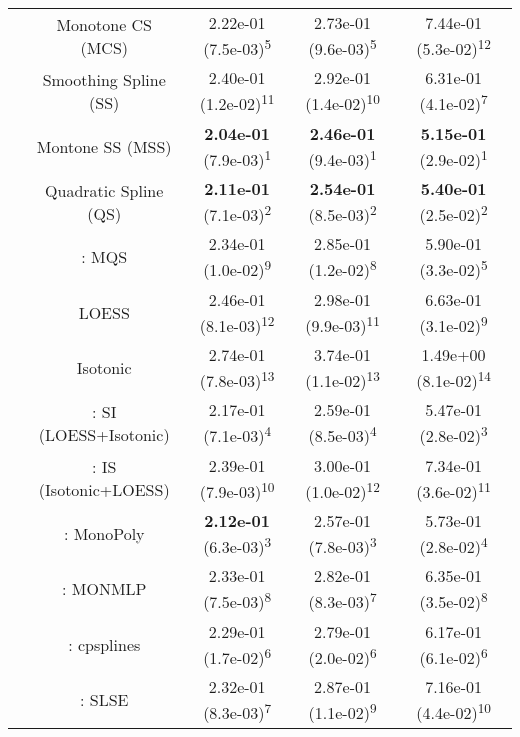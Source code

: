\begin{tabular}{ccccc}
&Monotone CS (MCS)& 2.22e-01 (7.5e-03)\textsuperscript{5}& 2.73e-01 (9.6e-03)\textsuperscript{5}& 7.44e-01 (5.3e-02)\textsuperscript{12}\tabularnewline
&Smoothing Spline (SS)& 2.40e-01 (1.2e-02)\textsuperscript{11}& 2.92e-01 (1.4e-02)\textsuperscript{10}& 6.31e-01 (4.1e-02)\textsuperscript{7}\tabularnewline
&Montone SS (MSS)& \textbf{2.04e-01} (7.9e-03)\textsuperscript{1}& \textbf{2.46e-01} (9.4e-03)\textsuperscript{1}& \textbf{5.15e-01} (2.9e-02)\textsuperscript{1}\tabularnewline
&Quadratic Spline (QS)& \textbf{2.11e-01} (7.1e-03)\textsuperscript{2}& \textbf{2.54e-01} (8.5e-03)\textsuperscript{2}& \textbf{5.40e-01} (2.5e-02)\textsuperscript{2}\tabularnewline
&\textcite{heMonotoneBsplineSmoothing1998}: MQS& 2.34e-01 (1.0e-02)\textsuperscript{9}& 2.85e-01 (1.2e-02)\textsuperscript{8}& 5.90e-01 (3.3e-02)\textsuperscript{5}\tabularnewline
&LOESS& 2.46e-01 (8.1e-03)\textsuperscript{12}& 2.98e-01 (9.9e-03)\textsuperscript{11}& 6.63e-01 (3.1e-02)\textsuperscript{9}\tabularnewline
&Isotonic& 2.74e-01 (7.8e-03)\textsuperscript{13}& 3.74e-01 (1.1e-02)\textsuperscript{13}& 1.49e+00 (8.1e-02)\textsuperscript{14}\tabularnewline
&\textcite{mammenEstimatingSmoothMonotone1991}: SI (LOESS+Isotonic)& 2.17e-01 (7.1e-03)\textsuperscript{4}& 2.59e-01 (8.5e-03)\textsuperscript{4}& 5.47e-01 (2.8e-02)\textsuperscript{3}\tabularnewline
&\textcite{mammenEstimatingSmoothMonotone1991}: IS (Isotonic+LOESS)& 2.39e-01 (7.9e-03)\textsuperscript{10}& 3.00e-01 (1.0e-02)\textsuperscript{12}& 7.34e-01 (3.6e-02)\textsuperscript{11}\tabularnewline
&\textcite{murrayFastFlexibleMethods2016a}: MonoPoly& \textbf{2.12e-01} (6.3e-03)\textsuperscript{3}& 2.57e-01 (7.8e-03)\textsuperscript{3}& 5.73e-01 (2.8e-02)\textsuperscript{4}\tabularnewline
&\textcite{cannonMonmlpMultilayerPerceptron2017}: MONMLP& 2.33e-01 (7.5e-03)\textsuperscript{8}& 2.82e-01 (8.3e-03)\textsuperscript{7}& 6.35e-01 (3.5e-02)\textsuperscript{8}\tabularnewline
&\textcite{navarro-garciaConstrainedSmoothingOutofrange2023}: cpsplines& 2.29e-01 (1.7e-02)\textsuperscript{6}& 2.79e-01 (2.0e-02)\textsuperscript{6}& 6.17e-01 (6.1e-02)\textsuperscript{6}\tabularnewline
&\textcite{groeneboomConfidenceIntervalsMonotone2023}: SLSE& 2.32e-01 (8.3e-03)\textsuperscript{7}& 2.87e-01 (1.1e-02)\textsuperscript{9}& 7.16e-01 (4.4e-02)\textsuperscript{10}\tabularnewline
\bottomrule
\end{tabular}
